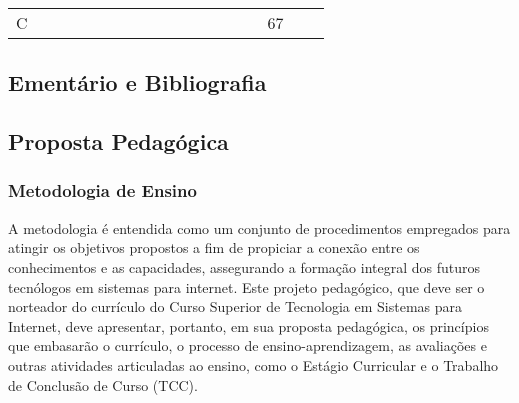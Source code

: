 \begin{landscape}
\begin{table}[h!]
\begin{tabular}{lcllcllcllcllcllcl}
\multicolumn{1}{|l|}{C}   & \multicolumn{1}{c|}{}                                                                                                   & \multicolumn{1}{l|}{}        &                         & \multicolumn{1}{l}{}                                                                                                       &                               &                         & \multicolumn{1}{l}{}                                                                                                    &                               &                         & \multicolumn{1}{l}{}                                                                                             &                               &                         & \multicolumn{1}{l}{}                                                                                                               & \multicolumn{1}{l|}{}         & \multicolumn{1}{l|}{67} & \multicolumn{1}{c|}{}                                                                                                        & \multicolumn{1}{l|}{}         \\ \cline{1-3} \cline{16-18} 
\end{tabular}
\end{table}


\end{landscape}


\subsection{Ementário e Bibliografia}



\subsection{Proposta Pedag\'ogica}

\subsubsection{Metodologia de Ensino}

A metodologia é entendida como um conjunto de procedimentos empregados para atingir os objetivos propostos a fim de propiciar a conexão entre os conhecimentos e as capacidades, assegurando a formação integral dos futuros tecnólogos em sistemas para internet. Este projeto pedagógico, que deve ser o norteador do currículo do Curso Superior de Tecnologia em Sistemas para Internet, deve apresentar, portanto, em sua proposta pedagógica, os princípios que embasarão o currículo, o processo de ensino-aprendizagem, as avaliações e outras atividades articuladas ao ensino, como o Estágio Curricular e o Trabalho de Conclusão de Curso (TCC).

